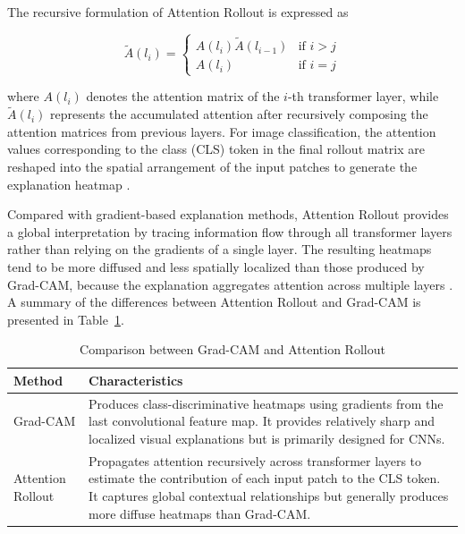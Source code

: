 \documentclass[conference]{IEEEtran}
\begin{document}
The recursive formulation of Attention Rollout is expressed as

\begin{equation}
    \tilde{A}(l_{i}) = \begin{cases}
        {A}(l_{i}) \tilde{A}(l_{i-1})   & \text{if } i > j\\
        {A}(l_{i})                      & \text{if } i = j
    \end{cases}
    \label{attention_rollout_equation}
\end{equation}

where $A(l_i)$ denotes the attention matrix of the $i$-th transformer layer, while $\tilde{A}(l_i)$ represents the accumulated attention after recursively composing the attention matrices from previous layers. For image classification, the attention values corresponding to the class (CLS) token in the final rollout matrix are reshaped into the spatial arrangement of the input patches to generate the explanation heatmap \cite{Abnar2020}.

Compared with gradient-based explanation methods, Attention Rollout provides a global interpretation by tracing information flow through all transformer layers rather than relying on the gradients of a single layer. The resulting heatmaps tend to be more diffused and less spatially localized than those produced by Grad-CAM, because the explanation aggregates attention across multiple layers \cite{Cheng2025,Li2023}. A summary of the differences between Attention Rollout and Grad-CAM is presented in Table~\ref{tab:gradcam_rollout}.

\begin{table}[htbp]
    \caption{Comparison between Grad-CAM and Attention Rollout}
    \label{tab:gradcam_rollout}
    \centering
    \small
    \setlength{\tabcolsep}{6pt}
    \begin{tabularx}{\columnwidth}{>{\raggedright\arraybackslash}p{2.5cm} >{\raggedright\arraybackslash}X}
        \toprule
        \textbf{Method} & \textbf{Characteristics} \\
        \midrule
        Grad-CAM & 
        Produces class-discriminative heatmaps using gradients from the last convolutional feature map. It provides relatively sharp and localized visual explanations but is primarily designed for CNNs. \\

        \addlinespace
        Attention Rollout & 
        Propagates attention recursively across transformer layers to estimate the contribution of each input patch to the CLS token. It captures global contextual relationships but generally produces more diffuse heatmaps than Grad-CAM. \\
        \bottomrule
    \end{tabularx}
\end{table}
\end{document}

